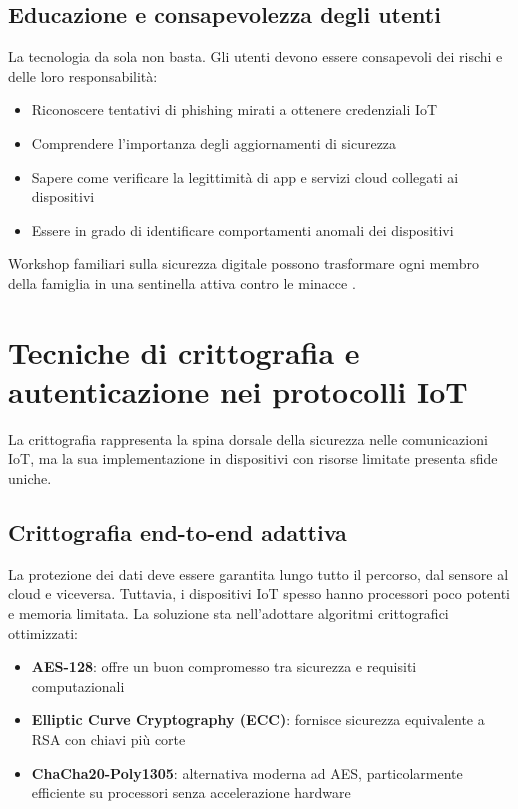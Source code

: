 \subsection{Educazione e consapevolezza degli utenti}

La tecnologia da sola non basta. Gli utenti devono essere consapevoli dei rischi e delle loro responsabilità:

\begin{itemize}
    \item Riconoscere tentativi di phishing mirati a ottenere credenziali IoT
    \item Comprendere l'importanza degli aggiornamenti di sicurezza
    \item Sapere come verificare la legittimità di app e servizi cloud collegati ai dispositivi
    \item Essere in grado di identificare comportamenti anomali dei dispositivi
\end{itemize}

Workshop familiari sulla sicurezza digitale possono trasformare ogni membro della famiglia in una sentinella attiva contro le minacce \parencite{sicari2015, yang2017}.

\section{Tecniche di crittografia e autenticazione nei protocolli IoT}

La crittografia rappresenta la spina dorsale della sicurezza nelle comunicazioni IoT, ma la sua implementazione in dispositivi con risorse limitate presenta sfide uniche.

\subsection{Crittografia end-to-end adattiva}

La protezione dei dati deve essere garantita lungo tutto il percorso, dal sensore al cloud e viceversa. Tuttavia, i dispositivi IoT spesso hanno processori poco potenti e memoria limitata. La soluzione sta nell'adottare algoritmi crittografici ottimizzati:

\begin{itemize}
    \item \textbf{AES-128}: offre un buon compromesso tra sicurezza e requisiti computazionali
    \item \textbf{Elliptic Curve Cryptography (ECC)}: fornisce sicurezza equivalente a RSA con chiavi più corte
    \item \textbf{ChaCha20-Poly1305}: alternativa moderna ad AES, particolarmente efficiente su processori senza accelerazione hardware
\end{itemize}


